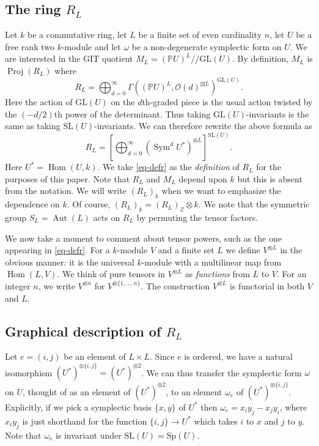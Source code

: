 \documentclass{amsart}
\theoremstyle{definition}
\theoremstyle{remark}
\DeclareMathOperator{\Proj}{Proj}
\DeclareMathOperator{\Sym}{Sym}
\DeclareMathOperator{\Hom}{Hom}
\DeclareMathOperator{\Aut}{Aut}
\def\GL{\mathrm{GL}}
\def\SL{\mathrm{SL}}
\def\Sp{\mathrm{Sp}}
\def\Z{\mathbb{Z}}
\def\P{\mathbb{P}}
\def\cq{/\!/}
\let\ms\mathscr
\begin{document}
\subsection{The ring $R_L$}

Let $k$ be a commutative ring, let $L$ be a finite set of even cardinality
$n$, let $U$ be a free rank two $k$-module and let $\omega$ be a
non-degenerate symplectic form on $U$.  We are interested in the GIT quotient
$M_L=(\P{U})^L \cq \GL(U)$.
By definition, $M_L$ is $\Proj(R_L)$ where
\begin{displaymath}
R_L= \bigoplus_{d=0}^{\infty} \Gamma( (\P{U})^L, \ms{O}(d)^{\boxtimes
L})^{\GL(U)}.
\end{displaymath}
Here the action of $\GL(U)$ on the $d$th-graded piece is the usual action
twisted by the $(-d/2)$th power of the determinant.  Thus taking
$\GL(U)$-invariants is the same as taking $\SL(U)$-invariants.  We can
therefore rewrite the above formula as
\begin{equation}
\label{eq-defr}
R_L=\left[ \bigoplus_{d=0}^{\infty} (\Sym^d{U^*})^{\otimes{L}}
\right]^{\SL(U)}.
\end{equation}
Here $U^*=\Hom(U, k)$.  We take \eqref{eq-defr} as the \emph{definition} of
$R_L$ for the purposes of this paper.  Note that $R_L$ and $M_L$ depend upon
$k$ but this is absent from the notation.  We will write $(R_L)_k$ when we
want to emphasize the dependence on $k$.  Of course, $(R_L)_k=(R_L)_{\Z}
\otimes k$. We
note that the symmetric group $S_L=\Aut(L)$ acts on $R_L$ by permuting the
tensor factors.

We now take a moment to comment about tensor powers, such as the one appearing
in \eqref{eq-defr}.  For a $k$-module $V$ and a finite set $L$ we define
$V^{\otimes L}$ in the obvious manner:  it is the universal $k$-module
with a multilinear map from $\Hom(L, V)$.  We think of pure tensors in
$V^{\otimes L}$ as \emph{functions} from $L$ to $V$.  For an integer $n$,
we write $V^{\otimes n}$ for $V^{\otimes \{1, \ldots, n\}}$.  The
construction $V^{\otimes L}$ is functorial in both $V$ and $L$.


\subsection{Graphical description of $R_L$}
\label{s-graph}

Let $e=(i, j)$ be an element of $L \times L$.  Since $e$ is ordered, we have
a natural isomorphism $(U^*)^{\otimes \{i, j\}}=(U^*)^{\otimes 2}$.  We can
thus transfer the symplectic form $\omega$ on $U$, thought of as an element of
$(U^*)^{\otimes 2}$, to an element $\omega_e$ of $(U^*)^{\otimes \{i, j\}}$.
Explicitly, if we pick a symplectic basis $\{x, y\}$ of $U^*$ then $\omega_e=
x_i y_j - x_j y_i$, where $x_i y_j$ is just shorthand for the function $\{i,
j\} \to U^*$ which takes $i$ to $x$ and $j$ to $y$.  Note that $\omega_e$ is
invariant under $\SL(U)=\Sp(U)$.
\end{document}
